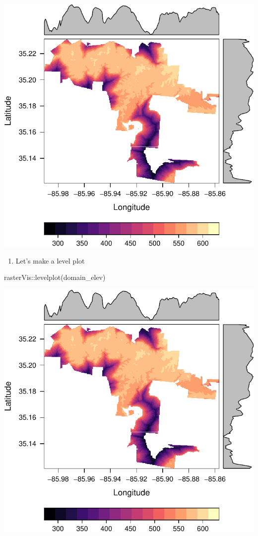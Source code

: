 \documentclass[
]{book}
\newenvironment{Shaded}{\begin{snugshade}}{\end{snugshade}}
\newcommand{\FunctionTok}[1]{\textcolor[rgb]{0.00,0.00,0.00}{#1}}
\newcommand{\NormalTok}[1]{#1}
\newcommand{\SpecialCharTok}[1]{\textcolor[rgb]{0.00,0.00,0.00}{#1}}
\providecommand{\tightlist}{%
  \setlength{\itemsep}{0pt}\setlength{\parskip}{0pt}}
\begin{document}
\includegraphics{figures/unnamed-chunk-437-1.pdf}

\begin{enumerate}
\def\labelenumi{\arabic{enumi}.}
\setcounter{enumi}{29}
\tightlist
\item
  Let's make a level plot
\end{enumerate}

\begin{Shaded}
\begin{Highlighting}[]
\NormalTok{rasterVis}\SpecialCharTok{::}\FunctionTok{levelplot}\NormalTok{(domain\_elev)}
\end{Highlighting}
\end{Shaded}

\includegraphics{figures/unnamed-chunk-438-1.pdf}
\end{document}
